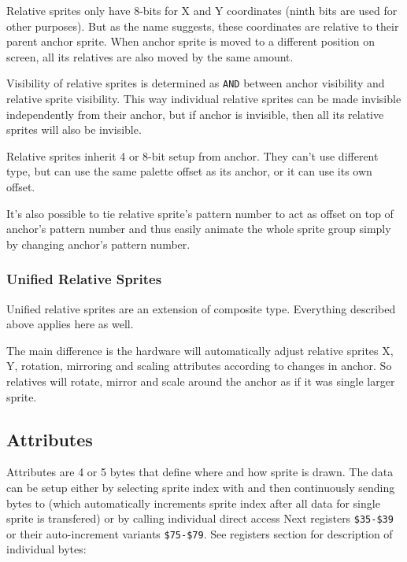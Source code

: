 \documentclass[12pt,twoside,openright,a4paper]{book}
\begin{document}
Relative sprites only have 8-bits for X and Y coordinates (ninth bits are used for other purposes). But as the name suggests, these coordinates are relative to their parent anchor sprite. When anchor sprite is moved to a different position on screen, all its relatives are also moved by the same amount.

Visibility of relative sprites is determined as {\tt AND} between anchor visibility and relative sprite visibility. This way individual relative sprites can be made invisible independently from their anchor, but if anchor is invisible, then all its relative sprites will also be invisible.

Relative sprites inherit 4 or 8-bit setup from anchor. They can't use different type, but can use the same palette offset as its anchor, or it can use its own offset.

It's also possible to tie relative sprite's pattern number to act as offset on top of anchor's pattern number and thus easily animate the whole sprite group simply by changing anchor's pattern number.

\subsubsection{Unified Relative Sprites}

Unified relative sprites are an extension of composite type. Everything described above applies here as well.

The main difference is the hardware will automatically adjust relative sprites X, Y, rotation, mirroring and scaling attributes according to changes in anchor. So relatives will rotate, mirror and scale around the anchor as if it was single larger sprite.

\subsection{Attributes}

Attributes are 4 or 5 bytes that define where and how sprite is drawn. The data can be setup either by selecting sprite index with  and then continuously sending bytes to  (which automatically increments sprite index after all data for single sprite is transfered) or by calling individual direct access Next registers {\tt \$35-\$39} or their auto-increment variants {\tt \$75-\$79}. See registers section for description of individual bytes:
\end{document}
